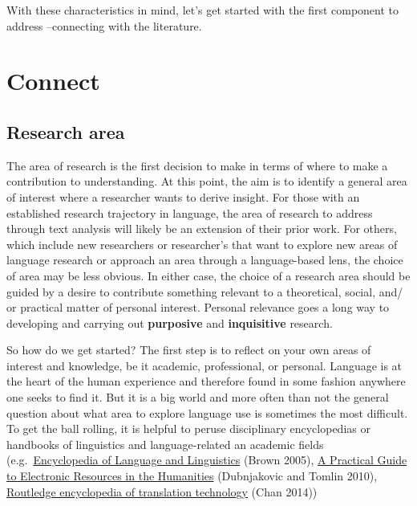 \documentclass[
  letterpaper,
]{latex/krantz}
\begin{document}
With these characteristics in mind, let's get started with the first
component to address --connecting with the literature.

\hypertarget{connect}{%
\section{Connect}\label{connect}}

\hypertarget{research-area}{%
\subsection{Research area}\label{research-area}}

The area of research is the first decision to make in terms of where to
make a contribution to understanding. At this point, the aim is to
identify a general area of interest where a researcher wants to derive
insight. For those with an established research trajectory in language,
the area of research to address through text analysis will likely be an
extension of their prior work. For others, which include new researchers
or researcher's that want to explore new areas of language research or
approach an area through a language-based lens, the choice of area may
be less obvious. In either case, the choice of a research area should be
guided by a desire to contribute something relevant to a theoretical,
social, and/ or practical matter of personal interest. Personal
relevance goes a long way to developing and carrying out
\textbf{purposive} and \textbf{inquisitive} research.

So how do we get started? The first step is to reflect on your own areas
of interest and knowledge, be it academic, professional, or personal.
Language is at the heart of the human experience and therefore found in
some fashion anywhere one seeks to find it. But it is a big world and
more often than not the general question about what area to explore
language use is sometimes the most difficult. To get the ball rolling,
it is helpful to peruse disciplinary encyclopedias or handbooks of
linguistics and language-related an academic fields
(e.g.~\href{https://www.sciencedirect.com/referencework/9780080448541/encyclopedia-of-language-and-linguistics}{Encyclopedia
of Language and Linguistics} (Brown 2005),
\href{https://www.sciencedirect.com/book/9781843345978/a-practical-guide-to-electronic-resources-in-the-humanities}{A
Practical Guide to Electronic Resources in the Humanities} (Dubnjakovic
and Tomlin 2010),
\href{https://www.routledgehandbooks.com/doi/10.4324/9781315749129}{Routledge
encyclopedia of translation technology} (Chan 2014))
\end{document}
